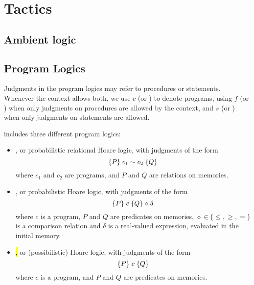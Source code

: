 \section{Tactics}

\subsection{Ambient logic}
































\subsection{Program Logics}

Judgments in the program logics may refer to procedures or
statements. Whenever the context allows both, we use $c$ (or )
to denote programs, using $f$ (or ) when only judgments on
procedures are allowed by the context, and $s$ (or ) when only
judgments on statements are allowed.

\EasyCrypt includes three different program logics:
\begin{itemize}
\item \prhl, or probabilistic relational Hoare logic, with judgments of the form
$$\{P\}\; c_1 \mathrel{\sim} c_2\; \{Q\}$$
where $c_1$ and $c_2$ are programs, and $P$ and $Q$
are relations on memories.
\item \phl, or probabilistic Hoare logic, with judgments of the form
$$\{P\}\; c\; \{Q\} \mathrel{\diamond} \delta$$
where $c$ is a program, $P$ and $Q$ are predicates on memories,
$\diamond\in\{\leq,\geq,=\}$ is a comparison relation and $\delta$ is
a real-valued expression, evaluated in the initial memory.
\item \hl, or (possibilistic) Hoare logic, with judgments of the form
$$\{P\}\; c\; \{Q\}$$
where $c$ is a program, and $P$ and $Q$ are predicates on memories.
\end{itemize}

